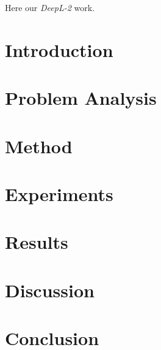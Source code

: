 \documentclass[11pt]{article}
\begin{document}
    \begin{multicols*}{2}

    \noindent Here our \emph{DeepL-2} work.

    \section{Introduction} %
    \label{sec:introduction}
    

    \section{Problem Analysis} %
    \label{sec:problem_analysis}
    

    \section{Method} %
    \label{sec:method}
    

    \section{Experiments} %
    \label{sec:experiments}
    

    \section{Results} %
    \label{sec:results}
    

    \section{Discussion} %
    \label{sec:discussion}
    

    \section{Conclusion} %
    \label{sec:conclusion}
    

    \end{multicols*}
\end{document}
